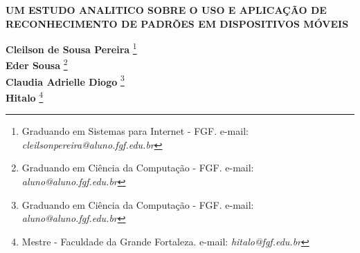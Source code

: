 \documentclass[12pt]{article}
\begin{document}

%



\begin{center}
\textbf{\Large{UM ESTUDO ANALITICO SOBRE O USO E APLICAÇÃO DE RECONHECIMENTO DE PADRÕES EM DISPOSITIVOS MÓVEIS}}\\
\end{center}

\vspace*{0.2cm}

\begin{flushright}
 {\bf Cleilson de Sousa Pereira} \footnote[1]{Graduando em Sistemas para Internet - FGF. e-mail: \it cleilsonpereira@aluno.fgf.edu.br}  \\
 {\bf Eder Sousa} \footnote[2]{Graduando em Ciência da Computação - FGF. e-mail: \it aluno@aluno.fgf.edu.br}  \\
  {\bf Claudia Adrielle Diogo} \footnote[3]{Graduando em Ciência da Computação - FGF. e-mail: \it aluno@aluno.fgf.edu.br}  \\
   {\bf Hitalo} \footnote[4]{Mestre - Faculdade da Grande Fortaleza. e-mail: \it hitalo@fgf.edu.br}   \\
\end{flushright}

\vspace*{0.5cm}

\end{document}
